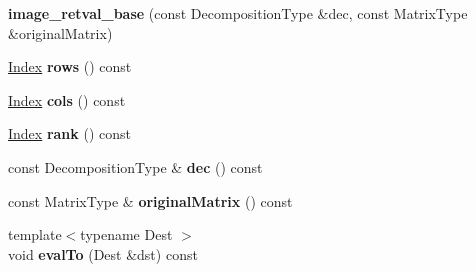 \begin{DoxyCompactItemize}
\mbox{\label{struct_eigen_1_1internal_1_1image__retval__base_a72c098f98f6702852f8341ee2406585f}} 
{\bfseries image\+\_\+retval\+\_\+base} (const Decomposition\+Type \&dec, const Matrix\+Type \&original\+Matrix)
\item 
\mbox{\label{struct_eigen_1_1internal_1_1image__retval__base_a37453f1615e91001e4e838293144c63f}} 
\hyperlink{namespace_eigen_a62e77e0933482dafde8fe197d9a2cfde}{Index} {\bfseries rows} () const
\item 
\mbox{\label{struct_eigen_1_1internal_1_1image__retval__base_a2f602147609d036b62b84c4257635abb}} 
\hyperlink{namespace_eigen_a62e77e0933482dafde8fe197d9a2cfde}{Index} {\bfseries cols} () const
\item 
\mbox{\label{struct_eigen_1_1internal_1_1image__retval__base_a13926ab4b6107eb6e8e6759a04c7406b}} 
\hyperlink{namespace_eigen_a62e77e0933482dafde8fe197d9a2cfde}{Index} {\bfseries rank} () const
\item 
\mbox{\label{struct_eigen_1_1internal_1_1image__retval__base_a46691a7d5e03235242acbce16cc0e78a}} 
const Decomposition\+Type \& {\bfseries dec} () const
\item 
\mbox{\label{struct_eigen_1_1internal_1_1image__retval__base_a6b7716d833c63bdd9b9625ee869e93d7}} 
const Matrix\+Type \& {\bfseries original\+Matrix} () const
\item 
\mbox{\label{struct_eigen_1_1internal_1_1image__retval__base_ad324e0d8a20369d3cdf61104227ed230}} 
{\footnotesize template$<$typename Dest $>$ }\\void {\bfseries eval\+To} (Dest \&dst) const
\end{DoxyCompactItemize}
